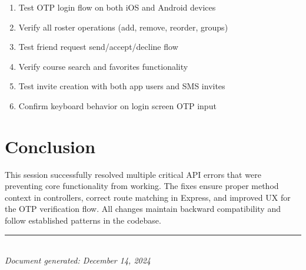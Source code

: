 \documentclass[11pt,a4paper]{article}
\begin{document}
\begin{enumerate}
    \item Test OTP login flow on both iOS and Android devices
    \item Verify all roster operations (add, remove, reorder, groups)
    \item Test friend request send/accept/decline flow
    \item Verify course search and favorites functionality
    \item Test invite creation with both app users and SMS invites
    \item Confirm keyboard behavior on login screen OTP input
\end{enumerate}

\section{Conclusion}

This session successfully resolved multiple critical API errors that were preventing core functionality from working. The fixes ensure proper method context in controllers, correct route matching in Express, and improved UX for the OTP verification flow. All changes maintain backward compatibility and follow established patterns in the codebase.

\vfill
\begin{center}
    \textcolor{primary}{\rule{0.5\textwidth}{1pt}}\\[0.3cm]
    \textit{Document generated: December 14, 2024}
\end{center}
\end{document}
